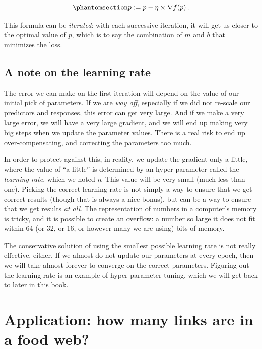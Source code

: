\documentclass[
  letterpaper,
]{scrbook}
\begin{document}
\begin{equation}\phantomsection\label{eq-gradientdescent-loop}{
p := p - \eta\times \nabla f(p) \,.
}\end{equation}

This formula can be \emph{iterated}: with each successive iteration, it
will get us closer to the optimal value of \(p\), which is to say the
combination of \(m\) and \(b\) that minimizes the loss.

\subsection{A note on the learning
rate}\label{sec-gradientdescent-learningrate}

The error we can make on the first iteration will depend on the value of
our initial pick of parameters. If we are \emph{way off}, especially if
we did not re-scale our predictors and responses, this error can get
very large. And if we make a very large error, we will have a very large
gradient, and we will end up making very big steps when we update the
parameter values. There is a real risk to end up over-compensating, and
correcting the parameters too much.

In order to protect against this, in reality, we update the gradient
only a little, where the value of ``a little'' is determined by an
hyper-parameter called the \emph{learning rate}, which we noted
\(\eta\). This value will be very small (much less than one). Picking
the correct learning rate is not simply a way to ensure that we get
correct results (though that is always a nice bonus), but can be a way
to ensure that we get results \emph{at all}. The representation of
numbers in a computer's memory is tricky, and it is possible to create
an overflow: a number so large it does not fit within 64 (or 32, or 16,
or however many we are using) bits of memory.

The conservative solution of using the smallest possible learning rate
is not really effective, either. If we almost do not update our
parameters at every epoch, then we will take almost forever to converge
on the correct parameters. Figuring out the learning rate is an example
of hyper-parameter tuning, which we will get back to later in this book.

\section{Application: how many links are in a food
web?}\label{sec-gradientdescent-application}
\end{document}
